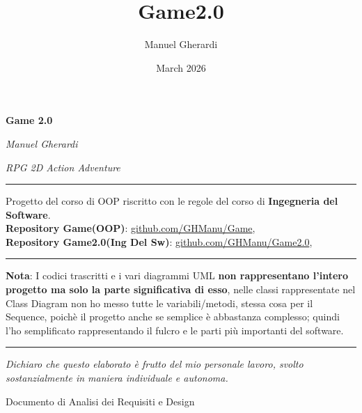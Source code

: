 \documentclass[12pt,a4paper]{article}
\title{Game2.0}
\author{Manuel Gherardi }
\date{March 2026}
\begin{document}
\begin{titlepage}
  \centering
  \vspace*{3cm}
  {\Huge\bfseries Game 2.0\par}
  \vspace{0.5cm}
  {\large\itshape Manuel Gherardi\par}
  {\large\itshape RPG 2D Action Adventure\par}
  \vspace{1.5cm}
  \hrule
  \vspace{1cm}
  {\normalsize
    Progetto del corso di OOP riscritto con le regole del corso di \textbf{Ingegneria del Software}.\\[0.3em]
    \textbf{Repository Game(OOP)}: \href{https://github.com/GHManu/Game}{github.com/GHManu/Game}, \\[0.3em]
    \textbf{Repository Game2.0(Ing Del Sw)}:  \href{https://github.com/GHManu/Game2.0}{github.com/GHManu/Game2.0}, \\[0.3em]
    \vspace{1cm}
    \hrule
    \vspace{1cm}
    \textbf{Nota}: I codici trascritti e i vari diagrammi UML \textbf{non rappresentano l'intero progetto ma solo la parte significativa di esso}, nelle classi rappresentate nel Class Diagram non ho messo tutte le variabili/metodi, stessa cosa per il Sequence, poichè il progetto anche se semplice è abbastanza complesso; quindi l'ho semplificato rappresentando il fulcro e le parti più importanti del software. 
  \par}
  \vspace{1cm}
  \hrule
  \vspace{1cm}
  {\itshape Dichiaro che questo elaborato è frutto del mio personale lavoro, svolto sostanzialmente in maniera individuale e autonoma. \par}
  \vfill
  {\small Documento di Analisi dei Requisiti e Design\par}
\end{titlepage}

\tableofcontents
\newpage

\end{document}
